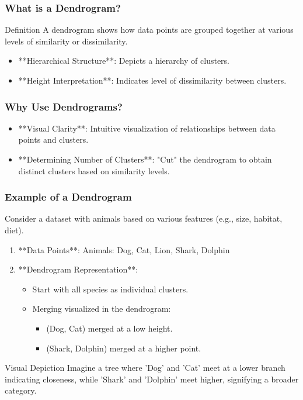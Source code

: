 \documentclass[aspectratio=169]{beamer}
\begin{document}
\begin{frame}[fragile]
    \frametitle{What is a Dendrogram?}
    \begin{block}{Definition}
        A dendrogram shows how data points are grouped together at various levels of similarity or dissimilarity.
    \end{block}
    
    \begin{itemize}
        \item **Hierarchical Structure**: Depicts a hierarchy of clusters.
        \item **Height Interpretation**: Indicates level of dissimilarity between clusters.
    \end{itemize}
\end{frame}

\begin{frame}[fragile]
    \frametitle{Why Use Dendrograms?}
    \begin{itemize}
        \item **Visual Clarity**: Intuitive visualization of relationships between data points and clusters.
        \item **Determining Number of Clusters**: "Cut" the dendrogram to obtain distinct clusters based on similarity levels.
    \end{itemize}
\end{frame}

\begin{frame}[fragile]
    \frametitle{Example of a Dendrogram}
    Consider a dataset with animals based on various features (e.g., size, habitat, diet).

    \begin{enumerate}
        \item **Data Points**: Animals: {Dog, Cat, Lion, Shark, Dolphin}
        \item **Dendrogram Representation**: 
            \begin{itemize}
                \item Start with all species as individual clusters.
                \item Merging visualized in the dendrogram:
                \begin{itemize}
                    \item (Dog, Cat) merged at a low height.
                    \item (Shark, Dolphin) merged at a higher point.
                \end{itemize}
            \end{itemize}
    \end{enumerate}
    \begin{block}{Visual Depiction}
        Imagine a tree where 'Dog' and 'Cat' meet at a lower branch indicating closeness, while 'Shark' and 'Dolphin' meet higher, signifying a broader category.
    \end{block}
\end{frame}
\end{document}
